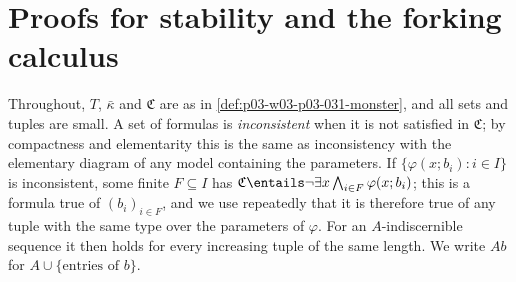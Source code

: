 \section{Proofs for stability and the forking calculus}
\label{sec:annex-p03-w03-p03-031-forking-calculus}

Throughout, \(T\), \(\bar\kappa\) and \(\mathfrak C\) are as in
\cref{def:p03-w03-p03-031-monster}, and all sets and tuples are small.  A
set of formulas is \emph{inconsistent} when it is not satisfied in
\(\mathfrak C\); by compactness and elementarity this is the same as
inconsistency with the elementary diagram of any model containing the
parameters.  If \(\{\varphi(x;b_i):i\in I\}\) is inconsistent, some finite
\(F\subseteq I\) has \(\mathfrak C\entails\neg\exists
x\bigwedge_{i\in F}\varphi(x;b_i)\); this is a formula true of
\((b_i)_{i\in F}\), and we use repeatedly that it is therefore true of any
tuple with the same type over the parameters of \(\varphi\).  For an
\(A\)-indiscernible sequence it then holds for every increasing tuple of
the same length.  We write \(Ab\) for \(A\cup\{\text{entries of }b\}\).


